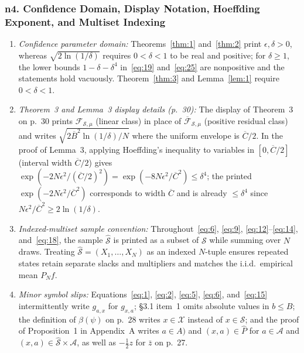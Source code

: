 \documentclass[11pt,letterpaper]{article}
\newcommand{\Cbar}{\overline{C}}
\theoremstyle{definition}
\begin{document}
\subsubsection*{n4. Confidence Domain, Display Notation, Hoeffding Exponent, and Multiset Indexing}
\begin{enumerate}[label=(\alph*),leftmargin=2em,itemsep=2pt]
  \item \emph{Confidence parameter domain:} Theorems~\ref{thm:1} and~\ref{thm:2} print $\epsilon,\delta > 0$, whereas $\sqrt{2\ln(1/\delta)}$ requires $0 < \delta < 1$ to be real and positive; for $\delta \ge 1$, the lower bounds $1-\delta-\delta^4$ in~\eqref{eq:19} and~\eqref{eq:25} are nonpositive and the statements hold vacuously. Theorem~\ref{thm:3} and Lemma~\ref{lem:1} require $0<\delta<1$.
  \item \emph{Theorem~3 and Lemma~3 display details (p.~30):} The display of Theorem~3 on p.~30 prints $\mathcal{F}_{\mathcal{S},\mu}$ (linear class) in place of $\overline{\mathcal{F}}_{\mathcal{S},\mu}$ (positive residual class) and writes $\sqrt{2\overline{B}^2\ln(1/\delta)/N}$ where the uniform envelope is $\Cbar/2$. In the proof of Lemma~3, applying Hoeffding's inequality to variables in $[0,\Cbar/2]$ (interval width $\Cbar/2$) gives $\exp(-2N\epsilon^2/(\Cbar/2)^2) = \exp(-8N\epsilon^2/\Cbar^2) \le \delta^4$; the printed $\exp(-2N\epsilon^2/\Cbar^2)$ corresponds to width $\Cbar$ and is already $\le \delta^4$ since $N\epsilon^2/\Cbar^2 \ge 2\ln(1/\delta)$.
  \item \emph{Indexed-multiset sample convention:} Throughout~\eqref{eq:6}, \eqref{eq:9}, \eqref{eq:12}--\eqref{eq:14}, and~\eqref{eq:18}, the sample $\widehat{\mathcal{S}}$ is printed as a subset of $\mathcal{S}$ while summing over $N$ draws. Treating $\widehat{\mathcal{S}} = (X_1,\ldots,X_N)$ as an indexed $N$-tuple ensures repeated states retain separate slacks and multipliers and matches the i.i.d.\ empirical mean $P_N f$.
  \item \emph{Minor symbol slips:} Equations~\eqref{eq:1}, \eqref{eq:2}, \eqref{eq:5}, \eqref{eq:6}, and~\eqref{eq:15} intermittently write $g_{a,x}$ for $g_{x,a}$; \S3.1 item~1 omits absolute values in $b\le B$; the definition of $\beta(\psi)$ on p.~28 writes $x\in\mathcal{X}$ instead of $x\in\mathcal{S}$; and the proof of Proposition~1 in Appendix~A writes $a\in A)$ and $(x,a)\in\widehat{P}$ for $a\in\mathcal{A}$ and $(x,a)\in\widehat{\mathcal{S}}\times\mathcal{A}$, as well as $-\frac{1}{2}z$ for $\bar{z}$ on p.~27.
\end{enumerate}
\end{document}
